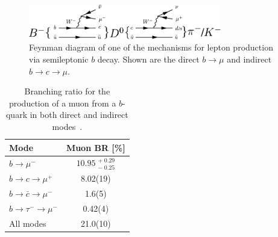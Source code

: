 \begin{figure}[htbp]
  \centering
    \includegraphics[width=0.75\textwidth]{PartDetector/Diagrams/SemiLeptonicBDecay.pdf}
    \caption[Feynman diagram of one of the mechanisms for lepton production via semileptonic $b$ decay.]{Feynman diagram of one of the mechanisms for lepton production via semileptonic $b$ decay. Shown are the direct $b\rightarrow \mu$ and indirect $b\rightarrow c\rightarrow\mu$.}\label{fig:DetectorSLTFeynm}
\end{figure}

\begin{table}[htbp]
  \centering
    \begin{tabular}{@{}lS[table-format=2.2(2)]@{}}
      \toprule
      Mode                                        & {Muon BR [\si{\percent}]} \\
      \midrule %
      $b\rightarrow \mu^{-}$                      & {$\num{10.95}\;^{+\;0.29}_{-\;0.25}$} \\
      $b\rightarrow c \rightarrow \mu^{+}$        & 8.02(19) \\
      $b\rightarrow \bar{c} \rightarrow \mu^{-}$  & 1.6(5) \\
      $b\rightarrow \tau^{-} \rightarrow \mu^{-}$ & 0.42(4) \\
      \midrule %
      All modes                                   & 21.0(10) \\
      \bottomrule %
    \end{tabular}
    \caption[Branching ratio for the production of a muon from a $b$-quark in both direct and indirect modes.]{Branching ratio for the production of a muon from a $b$-quark in both direct and indirect modes~\cite{Theory:PDGBooklet}.}\label{tab:DetectorSLTBR}
\end{table}

